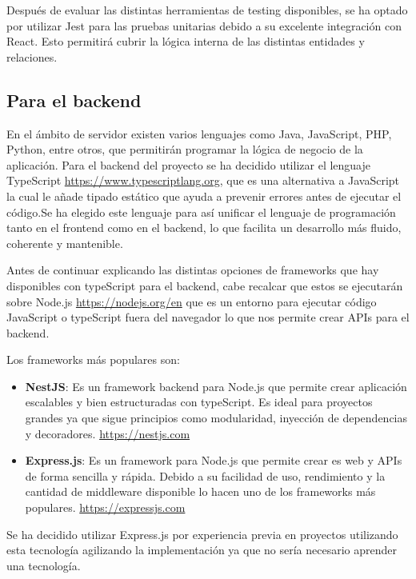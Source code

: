 Después de evaluar las distintas herramientas de testing disponibles, se ha optado por utilizar Jest para las pruebas unitarias debido a su excelente integración con React. Esto permitirá cubrir la lógica interna de las distintas entidades y relaciones.

\subsection{Para el backend}
En el ámbito de servidor existen varios lenguajes como Java, JavaScript, PHP, Python, entre otros, que permitirán programar la lógica de negocio de la aplicación. Para el backend del proyecto se ha decidido utilizar el lenguaje TypeScript \hyperlink{TypeScript}{https://www.typescriptlang.org}, que es una alternativa a JavaScript la cual le añade tipado estático que ayuda a prevenir errores antes de ejecutar el código.Se ha elegido este lenguaje para así unificar el lenguaje de programación tanto en el frontend como en el backend, lo que facilita un desarrollo más fluido, coherente y mantenible.

Antes de continuar explicando las distintas opciones de frameworks que hay disponibles con typeScript para el backend, cabe recalcar que estos se ejecutarán sobre Node.js \hyperlink{Node.js}{https://nodejs.org/en} que es un entorno para ejecutar código JavaScript o typeScript fuera del navegador lo que nos permite crear APIs para el backend.

Los frameworks más populares son:
\begin{itemize}
    \item \textbf{NestJS}: Es un framework backend para Node.js que permite crear aplicación escalables y bien estructuradas con typeScript. Es ideal para proyectos grandes ya que sigue principios como modularidad, inyección de dependencias y decoradores. \hyperlink{NestJS}{https://nestjs.com}
    \item \textbf{Express.js}: Es un framework para Node.js que permite crear 
    es web y APIs de forma sencilla y rápida. Debido a su facilidad de uso, rendimiento y la cantidad de middleware disponible lo hacen uno de los frameworks más populares. \hyperlink{Express.js}{https://expressjs.com}
\end{itemize}

Se ha decidido utilizar Express.js por experiencia previa en proyectos utilizando esta tecnología agilizando la implementación ya que no sería necesario aprender una tecnología.


